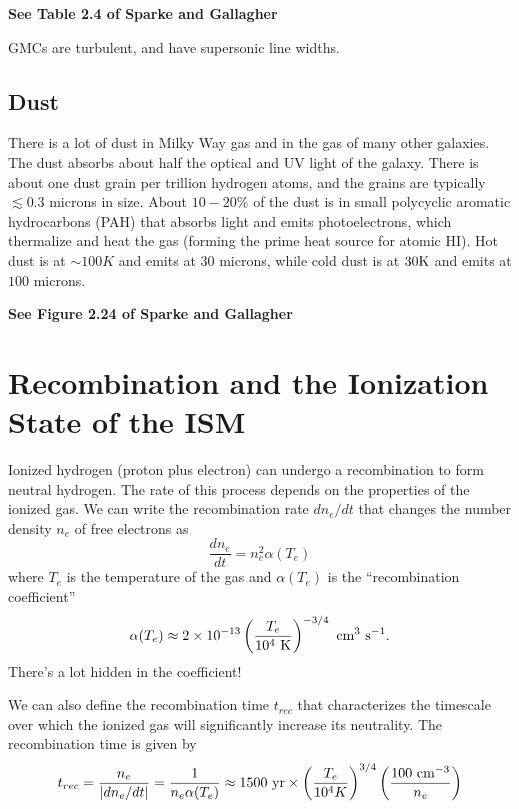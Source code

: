 \documentclass[]{article}
\begin{document}
{\bf See Table 2.4 of Sparke and Gallagher}

GMCs are turbulent, and have supersonic line widths.

\subsection{Dust}

There is a lot of dust in Milky Way gas and in the
gas of many other galaxies.  The dust absorbs about
half the optical and UV light of the galaxy.  There
is about one dust grain per trillion hydrogen atoms,
and the grains are typically $\lesssim0.3$ microns
in size. About $10-20\%$ of the dust is in small
polycyclic aromatic hydrocarbons (PAH) that absorbs
light and emits photoelectrons, which thermalize
and heat the gas (forming the prime heat source for
atomic HI).  Hot dust is at $\sim100K$ and emits at
$30$ microns, while cold dust is at $30\mathrm{K}$ and
emits at $100$ microns.


{\bf See Figure 2.24 of Sparke and Gallagher}

\section{Recombination and the Ionization State of the ISM}

Ionized hydrogen (proton plus electron) can undergo a recombination
to form neutral hydrogen. The rate of this process depends on the
properties of the ionized gas.  We can write the recombination rate
$dn_e/dt$ that changes the number density $n_e$ of free electrons as
\begin{equation}
\frac{d n_{e}}{d t} = n_{e}^2 \alpha(T_e)
\end{equation}
\noindent
where $T_e$ is the temperature of the gas and $\alpha(T_e)$ is 
the ``recombination coefficient''
\begin{equation}
\alpha(T_e) \approx 2 \times 10^{-13} \left( \frac{T_e}{10^4~\mathrm{K}}\right)^{-3/4}~\mathrm{cm}^{3}~\mathrm{s}^{-1}.
\end{equation}
\noindent
There's a lot hidden in the coefficient!

We can also define the recombination time $t_{rec}$ that characterizes
the timescale over which the ionized gas will significantly increase
its neutrality.  The recombination time is given by
\begin{equation}
t_{rec} = \frac{n_e}{|dn_e/dt|} = \frac{1}{n_e \alpha(T_e)} \approx 1500~\mathrm{yr} \times \left(\frac{T_e}{10^{4}K}\right)^{3/4}\left(\frac{100~\mathrm{cm}^{-3}}{n_e}\right)
\end{equation}
\end{document}
